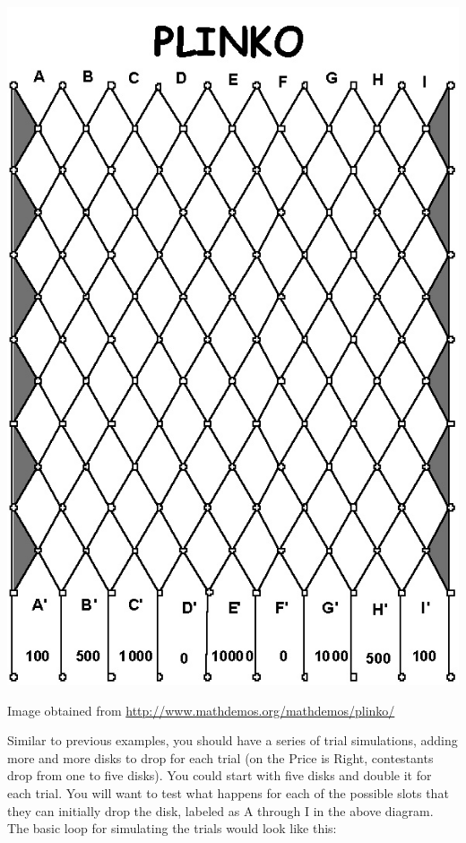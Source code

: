 \documentclass[letterpaper,10pt,openany,oneside]{sphinxmanual}
\begin{document}
\includegraphics{board.jpg}

Image obtained from \href{http://www.mathdemos.org/mathdemos/plinko/}{http://www.mathdemos.org/mathdemos/plinko/}

Similar to previous examples, you  should have a series of trial simulations,
adding more and more disks to drop for each trial (on the Price is Right, contestants
drop from one to five disks).  You could start with five disks and double it
for each trial.  You will want to test what happens for each of the possible
slots that they can initially drop the disk, labeled as A through I in the above diagram.
The basic loop for simulating the trials would look like this:
\end{document}
